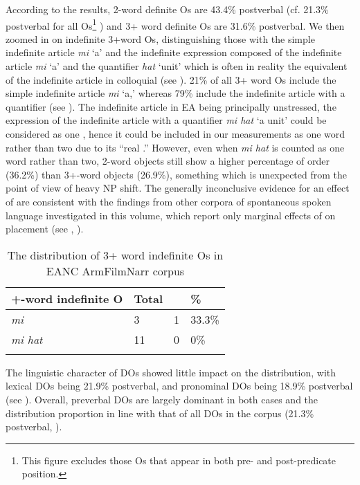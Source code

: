 \documentclass[output=paper,colorlinks,citecolor=brown,draftmode]{langscibook}
\begin{document}
According to the results, 2-word definite Os are 43.4\% postverbal (cf. 21.3\% postverbal for all Os\footnote{This figure excludes those Os that appear in both pre- and post-predicate position.} ) and 3+ word definite Os are 31.6\% postverbal. We then zoomed in on indefinite 3+word Os, distinguishing those with the simple indefinite article \textit{mi} `a' and the indefinite expression composed of the indefinite article \textit{mi} `a' and the quantifier \textit{hat} `unit' which is often in reality the equivalent of the indefinite article in colloquial  (see ). 21\% of all 3+ word Os include the simple indefinite article \textit{mi} `a,' whereas 79\% include the indefinite article with a quantifier (see ). The indefinite article in EA being principally unstressed, the expression of the indefinite article with a quantifier \textit{mi hat} `a unit' could be considered as one , hence it could be included in our measurements as one word rather than two due to its ``real .'' However, even when \textit{mi hat} is counted as one word rather than two, 2-word objects still show a higher percentage of  order (36.2\%) than 3+-word objects (26.9\%), something which is unexpected from the point of view of heavy NP shift. The generally inconclusive evidence for an effect of  are consistent with the findings from other corpora of spontaneous spoken language investigated in this volume, which report only marginal effects of  on  placement (see , ).

\begin{table}
\begin{tabularx}{.8\textwidth}{lYYY}
+-word indefinite O & Total &  & \%  \\
\midrule
\textit{mi}&3&1&33.3\% \\
\textit{mi hat}&11&0&0\% \\
\lspbottomrule
    \end{tabularx}
    \caption{The distribution of 3+ word indefinite Os in EANC ArmFilmNarr corpus}
    \label{Armenian:tab:10}
\end{table}


 The linguistic character of DOs showed little impact on the  distribution, with lexical DOs being 21.9\% postverbal, and pronominal DOs being 18.9\% postverbal (see ). Overall, preverbal DOs are largely dominant in both cases and the distribution proportion in line with that of all DOs in the corpus (21.3\% postverbal, ).
\end{document}
